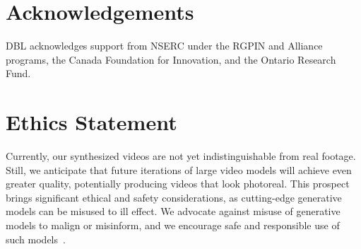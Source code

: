 \section*{Acknowledgements}
DBL acknowledges support from NSERC under the RGPIN and Alliance programs, the Canada Foundation for Innovation, and the Ontario Research Fund.

\section*{Ethics Statement}

Currently, our synthesized videos are not yet indistinguishable from real footage. Still, we anticipate that future iterations of large video models will achieve even greater quality, potentially producing videos that look photoreal. This prospect brings significant ethical and safety considerations, as cutting-edge generative models can be misused to ill effect. We advocate against misuse of generative models to malign or misinform, and we encourage safe and responsible use of such models~\citep{aisafety}.

